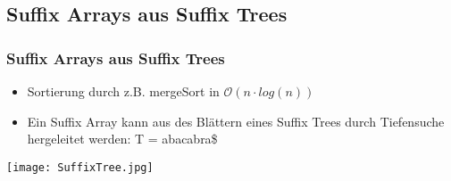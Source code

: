 \documentclass{beamer}
\begin{document}
\subsection{Suffix Arrays aus Suffix Trees}
\begin{frame}
\frametitle{Suffix Arrays aus Suffix Trees} %
\begin{itemize}
\item Sortierung durch z.B. mergeSort in $\mathcal{O}(n\cdot log (n))$
\item Ein Suffix Array kann aus des Blättern eines Suffix Trees durch Tiefensuche hergeleitet werden: T = \glqq abacabra\$\grqq\newline
\end{itemize}
\texttt{[image: SuffixTree.jpg]}%
\end{frame}
\end{document}
